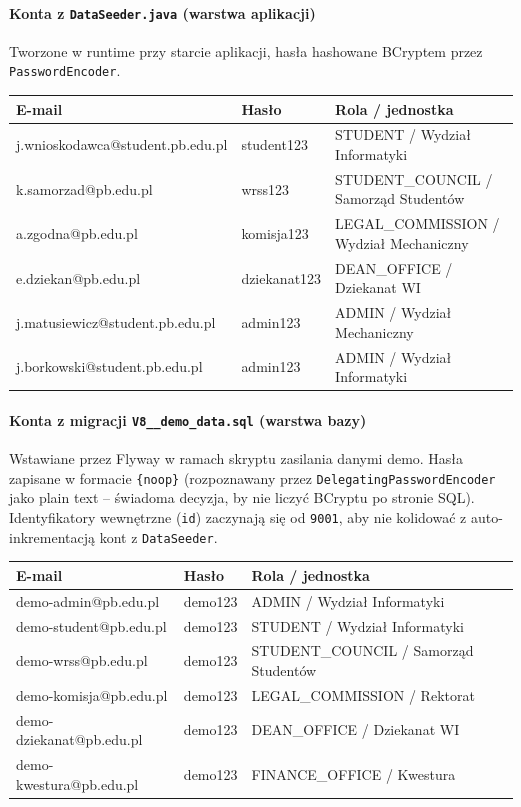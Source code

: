 \documentclass[12pt,a4paper]{article}
\begin{document}
\paragraph{Konta z \texttt{DataSeeder.java} (warstwa aplikacji)}
Tworzone w runtime przy starcie aplikacji, hasła hashowane BCryptem
przez \texttt{PasswordEncoder}.

\begin{tabularx}{\textwidth}{l l X}
  \toprule
  \textbf{E-mail} & \textbf{Hasło} & \textbf{Rola / jednostka} \\
  \midrule
  j.wnioskodawca@student.pb.edu.pl & student123 & STUDENT / Wydział Informatyki \\
  k.samorzad@pb.edu.pl & wrss123 & STUDENT\_COUNCIL / Samorząd Studentów \\
  a.zgodna@pb.edu.pl & komisja123 & LEGAL\_COMMISSION / Wydział Mechaniczny \\
  e.dziekan@pb.edu.pl & dziekanat123 & DEAN\_OFFICE / Dziekanat WI \\
  j.matusiewicz@student.pb.edu.pl & admin123 & ADMIN / Wydział Mechaniczny \\
  j.borkowski@student.pb.edu.pl & admin123 & ADMIN / Wydział Informatyki \\
  \bottomrule
\end{tabularx}

\paragraph{Konta z migracji \texttt{V8\_\_demo\_data.sql} (warstwa bazy)}
Wstawiane przez Flyway w ramach skryptu zasilania danymi demo. Hasła zapisane
w formacie \texttt{\{noop\}} (rozpoznawany przez \texttt{DelegatingPasswordEncoder}
jako plain text -- świadoma decyzja, by nie liczyć BCryptu po stronie SQL).
Identyfikatory wewnętrzne (\texttt{id}) zaczynają się od \texttt{9001}, aby
nie kolidować z auto-inkrementacją kont z \texttt{DataSeeder}.

\begin{tabularx}{\textwidth}{l l X}
  \toprule
  \textbf{E-mail} & \textbf{Hasło} & \textbf{Rola / jednostka} \\
  \midrule
  demo-admin@pb.edu.pl     & demo123 & ADMIN / Wydział Informatyki \\
  demo-student@pb.edu.pl   & demo123 & STUDENT / Wydział Informatyki \\
  demo-wrss@pb.edu.pl      & demo123 & STUDENT\_COUNCIL / Samorząd Studentów \\
  demo-komisja@pb.edu.pl   & demo123 & LEGAL\_COMMISSION / Rektorat \\
  demo-dziekanat@pb.edu.pl & demo123 & DEAN\_OFFICE / Dziekanat WI \\
  demo-kwestura@pb.edu.pl  & demo123 & FINANCE\_OFFICE / Kwestura \\
  \bottomrule
\end{tabularx}
\end{document}
